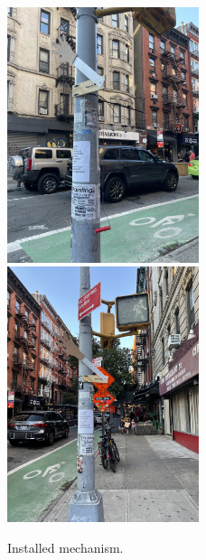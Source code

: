 \documentclass[11pt]{report}
\begin{document}
\begin{figure}[ht!]
\centering
\includegraphics[width=0.5\textwidth, angle=-90]{"images/II/install_closeup.JPG"}
\includegraphics[width=0.5\textwidth, angle=-90]{"images/II/install_closeup_2.JPG"}
\caption{Installed mechanism.}
\end{figure}
\end{document}
